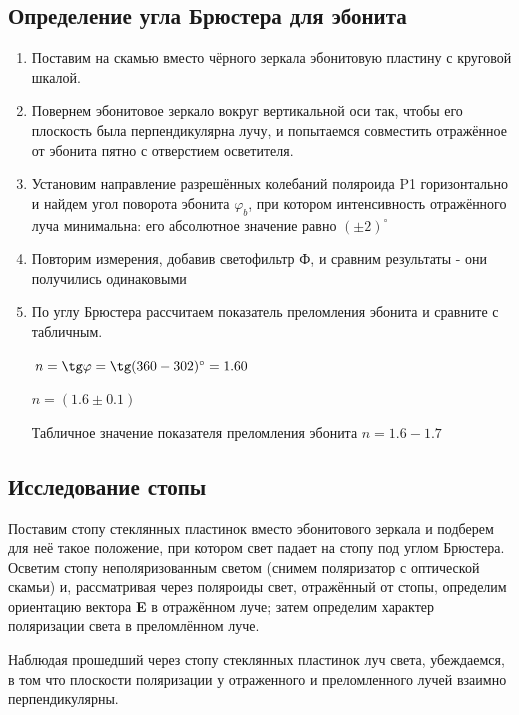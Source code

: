 \documentclass[15pt,a5paper,reqno]{article}
\begin{document}
\subsection{Определение угла Брюстера для эбонита}
\begin{enumerate}
\item Поставим на скамью вместо чёрного зеркала эбонитовую пластину с круговой шкалой.

\item  Повернем эбонитовое зеркало вокруг вертикальной оси так, чтобы его
плоскость была перпендикулярна лучу, и попытаемся совместить отражённое от эбонита пятно с отверстием осветителя.

\item Установим направление разрешённых
колебаний поляроида P1 горизонтально и найдем угол поворота эбонита
$\varphi_b$, при котором интенсивность
отражённого луча минимальна: его абсолютное значение равно $( \pm 2)^{\circ}$

\item Повторим измерения, добавив светофильтр Ф, и сравним результаты - они получились одинаковыми

\item По углу Брюстера рассчитаем показатель преломления эбонита и сравните с табличным.
\begin{center}
    $n = \tg \varphi = \tg (360-302)^{\circ} = 1.60$
\end{center}
\begin{center}
    $n = (1.6 \pm 0.1)$
\end{center}
Табличное значение показателя преломления эбонита $n = 1.6 - 1.7$

\end{enumerate}

\subsection{Исследование стопы}

\begin{figure}[h!]
\end{figure}

Поставим стопу стеклянных пластинок вместо эбонитового зеркала
и подберем для неё такое положение, при
котором свет падает на стопу под углом Брюстера.
Осветим стопу неполяризованным светом (снимем поляризатор с оптической скамьи) и, рассматривая через поляроиды свет, отражённый от стопы, определим ориентацию вектора
\textbf{E} в отражённом луче; затем определим
характер поляризации света в преломлённом луче. 
\par Наблюдая прошедший через стопу стеклянных пластинок луч света, убеждаемся, в
том что плоскости поляризации у отраженного и преломленного лучей взаимно
перпендикулярны. 
\end{document}
